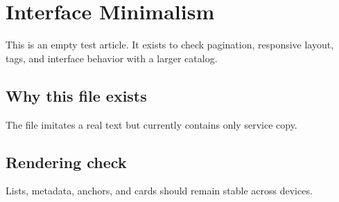 \section{Interface Minimalism}

This is an empty test article. It exists to check pagination, responsive layout, tags, and interface behavior with a larger catalog.

\subsection{Why this file exists}

The file imitates a real text but currently contains only service copy.

\subsection{Rendering check}

Lists, metadata, anchors, and cards should remain stable across devices.
